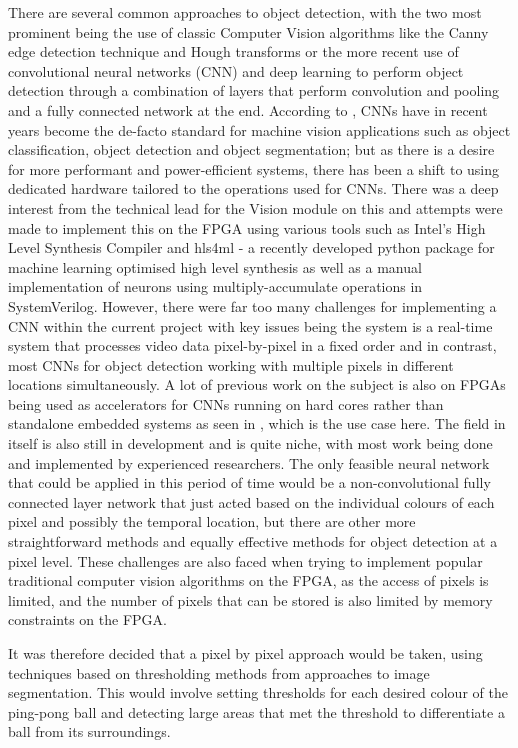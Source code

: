 \documentclass[a4paper]{article}
\begin{document}
There are several common approaches to object detection, with the two most 
prominent being the use of classic Computer Vision algorithms like the Canny edge
detection technique and Hough transforms or the more recent use of convolutional
neural networks (CNN) and deep learning to perform object detection through a 
combination of layers that perform convolution and pooling and a fully connected network
at the end. 
According to \cite{DBLP:journals/corr/abs-1806-01683}, CNNs have in recent years 
become the de-facto standard for machine vision applications such as object 
classification, object detection and object segmentation; but as there is a desire 
for more performant and power-efficient systems, there has been a shift to 
using dedicated hardware tailored to the operations used for CNNs. There was a 
deep interest from the technical lead for the Vision module on this and attempts
were made to implement this on the FPGA using various tools such as Intel's High 
Level Synthesis Compiler \cite{IntelHLS} and hls4ml - a recently developed 
python package for machine learning optimised high level synthesis \cite{HLS4ML} 
as well as a manual implementation of neurons using multiply-accumulate operations in SystemVerilog. 
However, there were far too many challenges for implementing a CNN within the 
current project with key issues being the system is a real-time system that 
processes video data pixel-by-pixel in a fixed order and in contrast, most CNNs for object 
detection working with multiple pixels in different locations simultaneously. 
A lot of previous work on the subject is also on FPGAs being used as accelerators for 
CNNs running on hard cores rather than standalone embedded systems as seen in \cite{DBLP:journals/corr/abs-1806-01683}
, which is the use case here. The field in itself is also still in development and is quite niche, 
with most work being done and implemented by experienced researchers. The only feasible neural network that could be applied in this period of time
would be a non-convolutional fully connected layer network that just acted based on the individual colours of each pixel
and possibly the temporal location, but there are other more straightforward methods 
and equally effective methods for object detection at a pixel level. 
These challenges are also faced when trying to implement popular traditional computer vision 
algorithms on the FPGA, as the access of pixels is limited, and the number of pixels that can be
stored is also limited by memory constraints on the FPGA. 

It was therefore decided that a pixel by pixel approach would be taken, using techniques
based on thresholding methods from approaches to image segmentation. This would
involve setting thresholds for each desired colour of the ping-pong ball and detecting large 
areas that met the threshold to differentiate a ball from its surroundings. 
\end{document}
